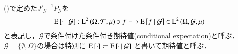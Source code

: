 	\begin{screen}
		\begin{dfn}
			()で定めた${J'_{\mathcal{G}}}^{-1} P_{\mathcal{G}}$を
			\begin{align}
				\operatorname{E} \left[ \cdot \ \middle|\ \mathcal{G} \right]:\operatorname{L}^{2} \left(\Omega, \mathcal{F},\mu\right) \ni f \longrightarrow \operatorname{E} \left[ f \ \middle|\ \mathcal{G} \right] \in \operatorname{L}^{2} \left(\Omega, \mathcal{G},\mu\right)
				\label{eq:dfn_L2_conditional_expectation}
			\end{align}
			と表記し，$\mathcal{G}$で条件付けた条件付き期待値(conditional expectation)と呼ぶ．
			$\mathcal{G} = \{\emptyset, \Omega\}$の場合は特別に
			$\operatorname{E} \left[ \cdot \right] \coloneqq \operatorname{E} \left[ \cdot \ \middle|\ \mathcal{G} \right]$
			と書いて期待値と呼ぶ．
		\end{dfn}
	\end{screen}
	
